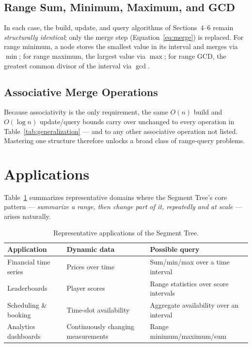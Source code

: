 \documentclass[11pt]{scrartcl}
\begin{document}
\subsection{Range Sum, Minimum, Maximum, and GCD}
In each case, the build, update, and query algorithms of Sections~4--6 remain \emph{structurally identical}; only the merge step (Equation~\eqref{eq:merge}) is replaced. For range minimum, a node stores the smallest value in its interval and merges via $\min$; for range maximum, the largest value via $\max$; for range GCD, the greatest common divisor of the interval via $\gcd$.

\subsection{Associative Merge Operations}
Because associativity is the only requirement, the same $O(n)$ build and $O(\log n)$ update/query bounds carry over unchanged to every operation in Table~\ref{tab:generalization} --- and to any other associative operation not listed. Mastering one structure therefore unlocks a broad class of range-query problems.

\section{Applications}

Table~\ref{tab:applications} summarizes representative domains where the Segment Tree's core pattern --- \emph{summarize a range, then change part of it, repeatedly and at scale} --- arises naturally.

\begin{table}[h]
\centering
\caption{Representative applications of the Segment Tree.}
\label{tab:applications}
\begin{tabular}{p{3.1cm}p{4.3cm}p{5.3cm}}
\toprule
\textbf{Application} & \textbf{Dynamic data} & \textbf{Possible query} \\
\midrule
Financial time series & Prices over time & Sum/min/max over a time interval \\
Leaderboards & Player scores & Range statistics over score intervals \\
Scheduling \& booking & Time-slot availability & Aggregate availability over an interval \\
Analytics dashboards & Continuously changing measurements & Range minimum/maximum/sum \\
\bottomrule
\end{tabular}
\end{table}
\end{document}
